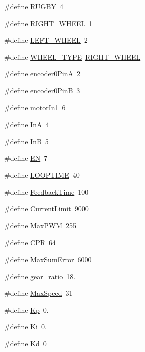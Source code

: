 \begin{DoxyCompactItemize}
\item 
\#define \hyperlink{vnh5019__base_8ino_ae4f4f4fb4e34839f60283078a5ebd8f2}{R\-U\-G\-B\-Y}~4
\item 
\#define \hyperlink{vnh5019__base_8ino_a30d958610ba5bb8268f6d9d121a334a9}{R\-I\-G\-H\-T\-\_\-\-W\-H\-E\-E\-L}~1
\item 
\#define \hyperlink{vnh5019__base_8ino_a0b2fbd27f02e3be60fc814a33af552b1}{L\-E\-F\-T\-\_\-\-W\-H\-E\-E\-L}~2
\item 
\#define \hyperlink{vnh5019__base_8ino_a4eb5cc405c99d702f2f3f2dc672583ff}{W\-H\-E\-E\-L\-\_\-\-T\-Y\-P\-E}~\hyperlink{vnh5019__base_8ino_a30d958610ba5bb8268f6d9d121a334a9}{R\-I\-G\-H\-T\-\_\-\-W\-H\-E\-E\-L}
\item 
\#define \hyperlink{vnh5019__base_8ino_ae821026f68673a780d177a5df02233ac}{encoder0\-Pin\-A}~2
\item 
\#define \hyperlink{vnh5019__base_8ino_abe5fbcbf16afd211ea9f1ddb4461ba5a}{encoder0\-Pin\-B}~3
\item 
\#define \hyperlink{vnh5019__base_8ino_a18e5ce2597e96cf276ada2321ddef3a2}{motor\-In1}~6
\item 
\#define \hyperlink{vnh5019__base_8ino_ad8a516b6ed9fcabd59e9da76359e45c2}{In\-A}~4
\item 
\#define \hyperlink{vnh5019__base_8ino_a7b86dd570e2760d2e4807ef9f4bfc0dc}{In\-B}~5
\item 
\#define \hyperlink{vnh5019__base_8ino_a22e6626f2c98ed902f8ded47f6438c05}{E\-N}~7
\item 
\#define \hyperlink{vnh5019__base_8ino_a8d6c0df235f6de920da3aa473a885d04}{L\-O\-O\-P\-T\-I\-M\-E}~40
\item 
\#define \hyperlink{vnh5019__base_8ino_aa3f87fce699d096217d168f254d9d131}{Feedback\-Time}~100
\item 
\#define \hyperlink{vnh5019__base_8ino_ae8de9852663b6b1e4218c93e2a8174a0}{Current\-Limit}~9000
\item 
\#define \hyperlink{vnh5019__base_8ino_a2b030b041f95fa6c041d4321d36343f3}{Max\-P\-W\-M}~255
\item 
\#define \hyperlink{vnh5019__base_8ino_ad8f1771d4051eafad228df4d397d7e47}{C\-P\-R}~64
\item 
\#define \hyperlink{vnh5019__base_8ino_ae614c26886c04c72d90a9f1f3e91f51e}{Max\-Sum\-Error}~6000
\item 
\#define \hyperlink{vnh5019__base_8ino_a2fb394a7873d557755b4547a6491f614}{gear\-\_\-ratio}~18.
\item 
\#define \hyperlink{vnh5019__base_8ino_a87308f2f15d9703dd9236408481a4491}{Max\-Speed}~31
\item 
\#define \hyperlink{vnh5019__base_8ino_a75bcee4b28157d51fa12c57a1a5d321a}{Kp}~0.
\item 
\#define \hyperlink{vnh5019__base_8ino_a6ccd383fe0d82309eac500d9bd3b825b}{Ki}~0.
\item 
\#define \hyperlink{vnh5019__base_8ino_a91066ed459a1747b160e47aa1dd54e36}{Kd}~0
\end{DoxyCompactItemize}
